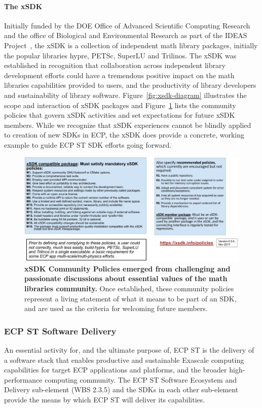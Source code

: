 \paragraph{The xSDK}
Initially funded by the DOE Office of Advanced Scientific Computing Research and the office of Biological and Environmental Research as part of the IDEAS Project~\cite{Bartlett:2017:XFT:3148208.3148212}, the xSDK is a collection of independent math library packages, initially the popular libraries hypre, PETSc, SuperLU and Trilinos. The xSDK was established in recognition that collaboration across independent library development efforts could have a tremendous positive impact on the math libraries capabilities provided to users, and the productivity of library developers and sustainability of library software.
Figure~\ref{fig:xsdk-diagram} illustrates the scope and interaction of xSDK packages and Figure~\ref{fig:xsdk-policies} lists the community policies that govern xSDK activities and set expectations for future xSDK members. While we recognize that xSDK experiences cannot be blindly applied to creation of new SDKs in ECP, the xSDK does provide a concrete, working example to guide ECP ST SDK efforts going forward.
\begin{figure}
	\centering
	\includegraphics[width=0.9\linewidth]{xSDK-Policies}
	\caption{\textbf{xSDK Community Policies emerged from challenging and passionate discussions about essential values of the math libraries community.} Once established, these community policies represent a living statement of what it means to be part of an SDK, and are used as the criteria for welcoming future members.}
	\label{fig:xsdk-policies}
\end{figure}

\subsubsection{ECP ST Software Delivery}
An essential activity for, and the ultimate purpose of, ECP ST is the delivery of a software stack that enables productive and sustainable Exascale computing capabilities for target ECP applications and platforms, and the broader high-performance computing community. The ECP ST Software Ecosystem and Delivery sub-element (WBS 2.3.5) and the SDKs in each other sub-element provide the means by which ECP ST will deliver its capabilities.
